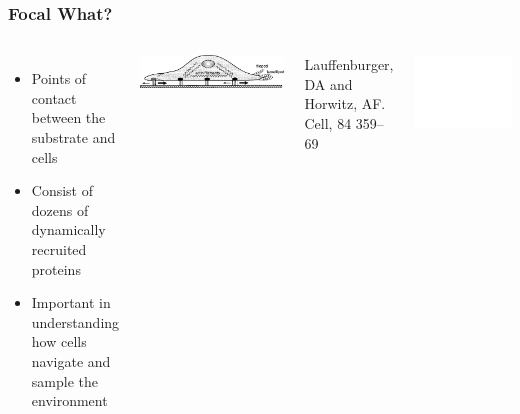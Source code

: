 \documentclass{beamer}
\newcommand{\figref}[1]{\begin{flushright}{\tiny #1 }\end{flushright}}
\begin{document}
\begin{frame}
	\frametitle{Focal What?}
	\begin{columns} 
		\begin{itemize}
		\item Points of contact between the substrate and cells
		\item Consist of dozens of dynamically recruited proteins
		\item Important in understanding how cells navigate and sample the environment
		\end{itemize}		

		\includegraphics[width=\textwidth]{figures/intro/cell_cartoon}	
		\figref{Lauffenburger, DA and Horwitz, AF. Cell, 84 359--69}
		\includegraphics[width=\textwidth]{figures/intro/focal_sample}	
	\end{columns} 
\end{frame}
\end{document}
